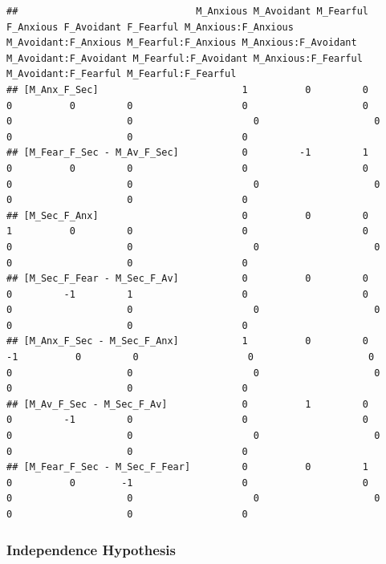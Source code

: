 \documentclass[
]{book}
\begin{document}
\begin{verbatim}
##                               M_Anxious M_Avoidant M_Fearful F_Anxious F_Avoidant F_Fearful M_Anxious:F_Anxious M_Avoidant:F_Anxious M_Fearful:F_Anxious M_Anxious:F_Avoidant M_Avoidant:F_Avoidant M_Fearful:F_Avoidant M_Anxious:F_Fearful M_Avoidant:F_Fearful M_Fearful:F_Fearful
## [M_Anx_F_Sec]                         1          0         0         0          0         0                   0                    0                   0                    0                     0                    0                   0                    0                   0
## [M_Fear_F_Sec - M_Av_F_Sec]           0         -1         1         0          0         0                   0                    0                   0                    0                     0                    0                   0                    0                   0
## [M_Sec_F_Anx]                         0          0         0         1          0         0                   0                    0                   0                    0                     0                    0                   0                    0                   0
## [M_Sec_F_Fear - M_Sec_F_Av]           0          0         0         0         -1         1                   0                    0                   0                    0                     0                    0                   0                    0                   0
## [M_Anx_F_Sec - M_Sec_F_Anx]           1          0         0        -1          0         0                   0                    0                   0                    0                     0                    0                   0                    0                   0
## [M_Av_F_Sec - M_Sec_F_Av]             0          1         0         0         -1         0                   0                    0                   0                    0                     0                    0                   0                    0                   0
## [M_Fear_F_Sec - M_Sec_F_Fear]         0          0         1         0          0        -1                   0                    0                   0                    0                     0                    0                   0                    0                   0
\end{verbatim}

\hypertarget{independence-hypothesis}{%
\subsubsection*{Independence Hypothesis}\label{independence-hypothesis}}
\end{document}
